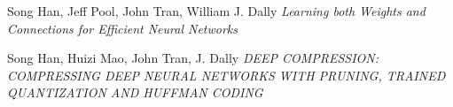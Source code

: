 \documentclass[journal]{vgtc}                %
\begin{document}
\begin{thebibliography}{2}

  Song Han, Jeff Pool, John Tran, William J. Dally
  \textit{Learning both Weights and Connections for Efficient Neural Networks}
  
  Song Han, Huizi Mao, John Tran, J. Dally
  \textit{DEEP COMPRESSION: COMPRESSING DEEP NEURAL NETWORKS WITH PRUNING, TRAINED QUANTIZATION AND HUFFMAN CODING}



\end{thebibliography}
\end{document}
